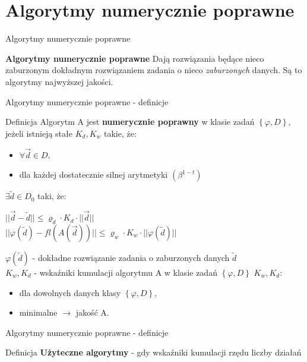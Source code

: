 $  $\section{Algorytmy numerycznie poprawne}
\begin{frame}{Algorytmy numerycznie poprawne}
	\begin{block}
		{\bf Algorytmy numerycznie poprawne}  Dają rozwiązania będące nieco zaburzonym dokładnym rozwiązaniem zadania o nieco {\it zaburzonych} danych. Są to algorytmy najwyższej jakości.
        
        
	\end{block}
\end{frame}
\begin{frame}{Algorytmy numerycznie poprawne - definicje}
	\begin{block}{Definicja}
    	Algorytm A jest {\bf numerycznie poprawny} w klasie zadań $\left\{ \varphi, D \right\}$, jeżeli istnieją stałe $K_d, K_w$ takie, że:
        \begin{itemize}
        	\item $\forall \vec{d} \in D$,
            \item dla każdej dostatecznie silnej arytmetyki $\left( \beta^{1-t} \right)$
        \end{itemize}
        $\exists \tilde{d} \in D_0$ taki, że:
        
        {\centering
        	$|| \vec{d} - \tilde{d} || \le \varrho_d \cdot K_d \cdot || \vec{d} ||$ \\ \vspace{.1cm}
            $|| \varphi(\tilde{d}) - fl(A(\vec{d})) || \le \varrho_w \cdot K_w \cdot || \varphi(\tilde{d}) ||$ \\}

        $\varphi(\tilde{d})$ - dokładne rozwiązanie zadania o zaburzonych danych $\tilde{d}$ \\
        $K_w, K_d$ - wskaźniki kumulacji algorytmu A w klasie zadań $\left\{\varphi, D\right\}$
        $K_w, K_d$:
        \begin{itemize}
        	\item dla dowolnych danych klasy $\left\{ \varphi, D \right\}$,
            \item minimalne $\rightarrow$ jakość A.
        \end{itemize}
	\end{block}
\end{frame}
\begin{frame}{Algorytmy numerycznie poprawne - definicje}
	\begin{block}{Definicja}
		{\bf Użyteczne algorytmy} - gdy wskaźniki kumulacji rzędu liczby działań
	\end{block}
\end{frame}
